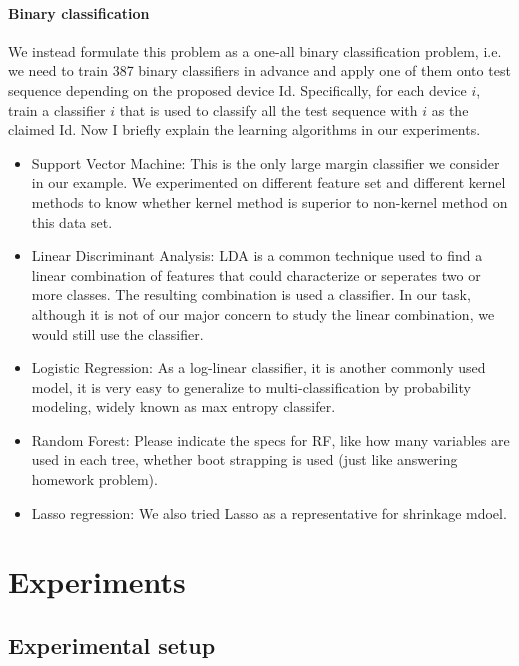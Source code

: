 \documentclass[11pt,letterpaper]{article}
\begin{document}
\paragraph {Binary classification}
We instead formulate this problem as a one-all binary classification problem, i.e. we need to train 387 binary classifiers in advance and apply one of them onto test sequence depending on the proposed device Id. Specifically, for each device $i$, train a classifier $i$ that is used to classify all the test sequence with $i$ as the claimed Id. Now I briefly explain the learning algorithms in our experiments.
\begin{itemize}
\item Support Vector Machine: This is the only large margin  classifier we consider in our example. We experimented on different feature set and different kernel methods to know whether kernel method is superior to non-kernel method on this data set.
\item Linear Discriminant Analysis: LDA is a common technique used to find a linear combination of features that could characterize or seperates two or more classes. The resulting combination is used a classifier. In our task, although it is not of our major concern to study the linear combination, we would still use the classifier.
\item Logistic Regression: As a log-linear classifier, it is another commonly used model, it is very easy to generalize to multi-classification by probability modeling, widely known as max entropy classifer.
\item Random Forest: Please indicate the specs for RF, like how many variables are used in each tree, whether boot strapping is used (just like answering homework problem).
\item Lasso regression: We also tried Lasso as a representative for shrinkage mdoel.
\end{itemize} 


\section{Experiments}
\label{sec:experiments}

\subsection{Experimental setup}
\label{sec:experimental-setup}
\end{document}
